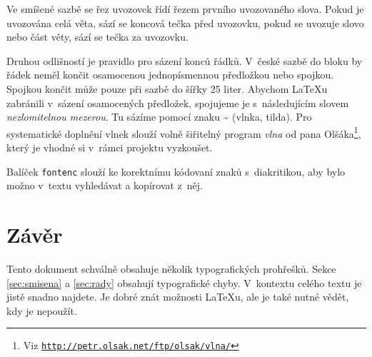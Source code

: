 \documentclass[a4paper, twocolumn, 10pt]{article}
\begin{document}
Ve smíšené sazbě se řez uvozovek řídí řezem prvního uvozovaného slova.
Pokud je uvozována celá věta, sází se koncová tečka před uvozovku, pokud se uvozuje slovo nebo část věty, sází se tečka za uvozovku.

Druhou odlišností je pravidlo pro sázení konců řádků.
V~české sazbě do bloku by řádek neměl končit osamocenou jednopísmennou předložkou nebo spojkou.
Spojkou  končit může pouze při sazbě do šířky 25 liter.
Abychom \LaTeX{}u zabránili v~sázení osamocených předložek, spojujeme je s~následujícím slovem \emph{nezlomitelnou mezerou}.
Tu sázíme pomocí znaku \~{} (vlnka, tilda).
Pro systematické doplnění vlnek slouží volně šiřitelný program \emph{vlna} od pana Olšáka\footnote{Viz \texttt{\url{http://petr.olsak.net/ftp/olsak/vlna/}}},
který je vhodné si v~rámci projektu vyzkoušet.

Balíček \texttt{fontenc} slouží ke korektnímu kódovaní znaků s~diakritikou, aby bylo možno v~textu vyhledávat a kopírovat z~něj.

\section{Závěr}

Tento dokument schválně obsahuje několik typografických prohřešků.
Sekce \ref{sec:smisena} a \ref{sec:rady} obsahují typografické chyby.
V~kontextu celého textu je jistě snadno najdete.
Je dobré znát možnosti \LaTeX{}u, ale je také nutné vědět, kdy je nepoužít.
\end{document}
